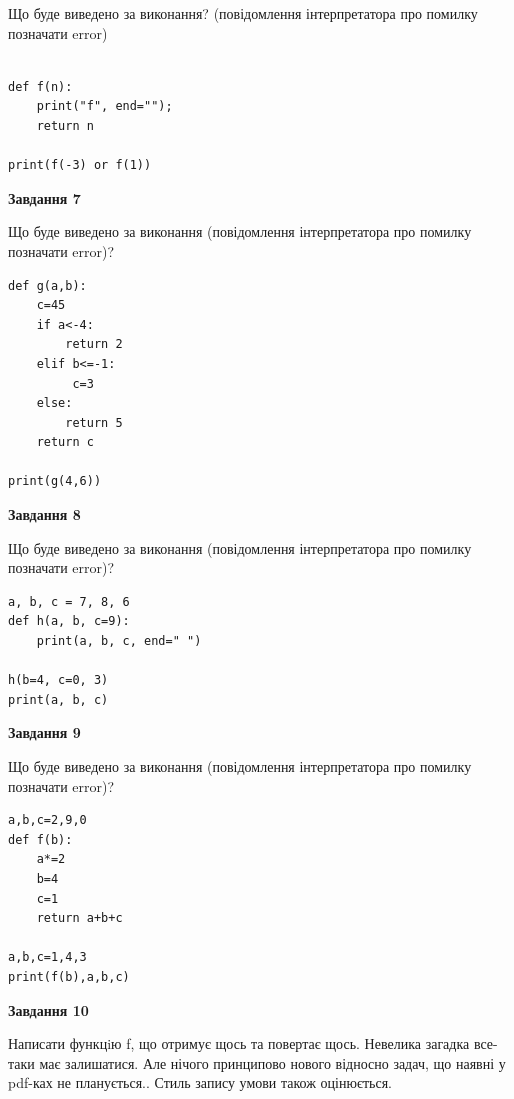 \documentclass[12pt, ukrainian]{article}
\begin{document}
{\begin {large}
Що буде виведено за виконання? (повідомлення інтерпретатора про помилку позначати error)\par
\begin{verbatim}

def f(n):
    print("f", end="");
    return n

print(f(-3) or f(1))
\end{verbatim}

{\begin {center}\textbf{Завдання 7}\end {center}}

Що буде виведено за виконання (повідомлення інтерпретатора про помилку позначати error)?\par
\begin{verbatim}
def g(a,b):
    c=45
    if a<-4:
        return 2
    elif b<=-1:
         c=3
    else: 
        return 5
    return c

print(g(4,6))
\end{verbatim}

{\begin {center}\textbf{Завдання 8}\end {center}}

Що буде виведено за виконання (повідомлення інтерпретатора про помилку позначати error)?\par
\begin{verbatim}
a, b, c = 7, 8, 6
def h(a, b, c=9):
    print(a, b, c, end=" ")

h(b=4, c=0, 3)
print(a, b, c)
\end{verbatim}

{\begin {center}\textbf{Завдання 9}\end {center}}

Що буде виведено за виконання (повідомлення інтерпретатора про помилку позначати error)?\par
\begin{verbatim}
a,b,c=2,9,0
def f(b):
    a*=2
    b=4
    c=1
    return a+b+c

a,b,c=1,4,3
print(f(b),a,b,c)
\end{verbatim}

{\begin {center}\textbf{Завдання 10}\end {center}}


Написати функцiю f, що отримує щось та повертає щось. Невелика загадка все-таки має залишатися. Але нічого принципово нового відносно задач, що наявні у pdf-ках не планується.. Стиль запису умови також оцінюється.\par
\end {large}}
\newpage
\end{document}
